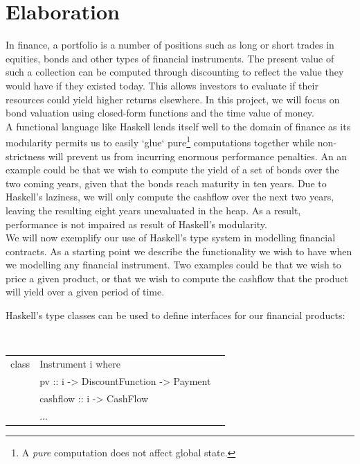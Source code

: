\documentclass[11pt]{article}
\begin{document}
\section*{Elaboration}

In finance, a portfolio is a number of positions such as long or short trades
in equities, bonds and other types of financial instruments. The present value
of such a collection can be computed through discounting to reflect the
value they would have if they existed today. This allows
investors to evaluate if their resources could yield higher returns elsewhere.
In this project, we will focus on bond valuation using closed-form functions
and the time value of money.\\

A functional language like Haskell lends itself well to the domain of finance as its
modularity permits us to easily `glue` pure\footnote{A \emph{pure} computation does not
affect global state.} computations together while non-strictness
will prevent us from incurring enormous performance penalties\cite{hughes:matters-cj}.
An an example could be that we wish to compute the yield of a set of bonds
over the two coming years, given that the bonds reach maturity in ten years.
Due to Haskell's laziness, we will only compute the cashflow over the next
two years, leaving the resulting eight years unevaluated in the heap.
As a result, performance is not impaired as result of Haskell's modularity.\\


We will now exemplify our use of Haskell's type system in modelling financial contracts.
As a starting point we describe the functionality we wish to have when we modelling
any financial instrument. Two examples could be that we wish to price a given
product, or that we wish to compute the cashflow that the product will yield
over a given period of time.

Haskell's type classes can be used to define interfaces for our financial products:

\begin{center}
\tt
\begin{tabular}{lll}
class & Instrument i where\\
      &\hspace{-1cm} pv       :: i -> DiscountFunction -> Payment\\
      &\hspace{-1cm} cashflow :: i -> CashFlow\\
      &\hspace{-1cm} ...\\
\end{tabular}
\end{center}
\end{document}
